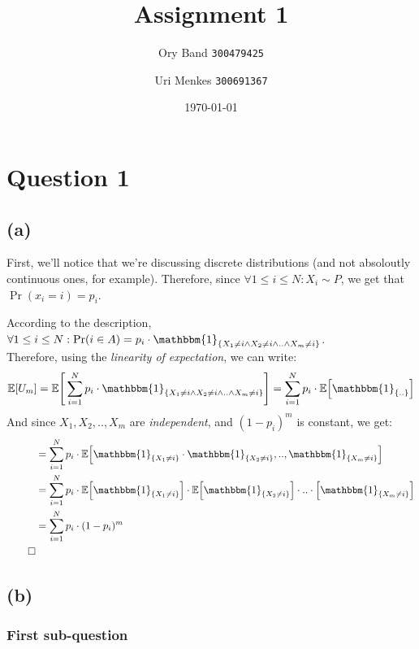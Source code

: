 \documentclass[a4paper]{article}
\title{Assignment 1}
\author{
    Ory Band \texttt{300479425} \and
    Uri Menkes \texttt{300691367}}
\date{\today}
\newcommand{\lc}{\left\{}
\newcommand{\rc}{\right\}}
\newcommand{\E}{\mathbb{E}}
\newcommand{\I}{\mathbbm{1}}
\newcommand{\Sum}{\sum\limits_{i=1}^N}
\newcommand{\qedsquare}{\tag*{$\square$}}
\begin{document}
\maketitle
\newpage

\section {Question 1}
\subsection {(a)}

First, we'll notice that we're discussing discrete distributions (and not absoloutly continuous ones, for example).
Therefore, since $ \forall 1 \leq i \leq N : X_i \sim P $, we get that $ \Pr(x_i=i)=p_i $.

According to the description,
$ \forall 1 \leq i \leq N : \Pr(i \in A) = p_i \cdot \I_{ \lc X_1 \neq i \wedge X_2 \neq i \wedge .. \wedge X_m\neq i \rc }   $. \\
Therefore, using the \textit{linearity of expectation}, we can write:
\begin{align*}
    \E[U_m] = \E \Bigg[ \Sum p_i \cdot \I_{ \lc X_1 \neq i \wedge X_2 \neq i \wedge .. \wedge X_m\neq i \rc } \Bigg]
    &= \Sum p_i \cdot \E \Big[ \I_{\lc..\rc} \Big] \\
\end{align*}
And since $ X_1, X_2, .., X_m $ are \textit{independent}, and $ (1-p_i)^m $ is constant, we get:
\begin{align*}
    &= \Sum p_i \cdot \E \Big[ \I_{\lc X_1 \neq i \rc} \cdot \I_{\lc X_2 \neq i \rc}, .. , \I_{\lc X_m \neq i \rc} \Big] \\
    &= \Sum p_i \cdot \E \Big[ \I_{\lc X_1 \neq i \rc} \Big] \cdot \E \Big[ \I_{\lc X_2 \neq i \rc} \Big] \cdot .. \cdot \Big[ \I_{\lc X_m \neq i \rc} \Big] \\
    &= \Sum p_i \cdot (1-p_i)^m \\
    \qedsquare
\end{align*}

\newpage

\subsection {(b)}

\subsubsection {First sub-question}
\end{document}
